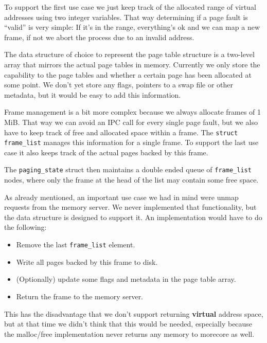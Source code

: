 \documentclass[a4paper,10pt]{article}
\begin{document}
To support the first use case we just keep track of the allocated range of virtual addresses using two integer variables.
That way determining if a page fault is ``valid'' is very simple: 
If it's in the range, everything's ok and we can map a new frame, if not we abort the process due to an invalid address.

The data structure of choice to represent the page table structure is a two-level array that mirrors the actual page tables in memory.
Currently we only store the capability to the page tables and whether a certain page has been allocated at some point.
We don't yet store any flags, pointers to a swap file or other metadata, but it would be easy to add this information.

Frame management is a bit more complex because we always allocate frames of 1 MiB.
That way we can avoid an IPC call for every single page fault, but we also have to keep track of free and allocated space within a frame.
The \lstinline!struct frame_list! manages this information for a single frame.
To support the last use case it also keeps track of the actual pages backed by this frame.

The \lstinline!paging_state! struct then maintains a double ended queue of \lstinline!frame_list! nodes, where only the frame at the head of the list may contain some free space.

As already mentioned, an important use case we had in mind were unmap requests from the memory server.
We never implemented that functionality, but the data structure is designed to support it.
An implementation would have to do the following:
\begin{itemize}
 \item Remove the last \lstinline!frame_list! element.
 \item Write all pages backed by this frame to disk.
 \item (Optionally) update some flags and metadata in the page table array.
 \item Return the frame to the memory server.
\end{itemize}


This has the disadvantage that we don't support returning \textbf{virtual} address space, but at that time we didn't think that this would be needed, 
especially because the malloc/free implementation never returns any memory to morecore as well.
\end{document}
